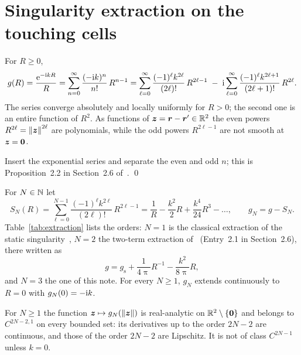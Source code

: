 \section{Singularity extraction on the touching cells}
\label{sec:extraction}

 For $R\ge0$,
\begin{equation}
    \label{eq:taylor}
    g(R) = \frac{\mathrm{e}^{-\mathrm{i} kR}}{R}
         = \sum_{n=0}^{\infty} \frac{(-\mathrm{i} k)^n}{n!}\,R^{n-1}
         = \sum_{\ell=0}^{\infty} \frac{(-1)^\ell k^{2\ell}}{(2\ell)!}\,R^{2\ell-1}
         \;-\;\mathrm{i} \sum_{\ell=0}^{\infty} \frac{(-1)^\ell k^{2\ell+1}}{(2\ell+1)!}\,R^{2\ell}.
\end{equation}
The series converge absolutely and locally uniformly for $R>0$; the second one is an entire function of $R^2$. As
functions of $\vb*{z}=\vb*{r}-\vb*{r}'\in\mathbb{R}^2$ the even powers $R^{2\ell}=\left\| \vb*{z} \right\|^{2\ell}$ are polynomials, while the odd powers
$R^{2\ell-1}$ are not smooth at $\vb*{z}=\vb*{0}$.

\vspace{\baselineskip}
\proof Insert the exponential series and separate the even and odd $n$; this is Proposition~2.2
in Section~2.6 of~\cite{machacek2025method}. \qed

 For $N\in\mathbb{N}$ let
\begin{equation}
    \label{eq:sn}
    S_N(R) = \sum_{\ell=0}^{N-1} \frac{(-1)^\ell k^{2\ell}}{(2\ell)!}\,R^{2\ell-1}
           = \frac{1}{R} - \frac{k^2}{2}R + \frac{k^4}{24}R^3 - \dots, \qquad
    g_N = g - S_N .
\end{equation}
Table~\ref{tab:extraction} lists the orders: $N=1$ is the classical extraction of the static singularity~\cite{Tzoulis2004}, $N=2$ the two-term extraction
of~\cite{machacek2025method} (Entry~2.1 in Section~2.6), there written as
\begin{equation}
    g=g_{\mathrm{s}}+\frac{1}{4\uppi}R^{-1}-\frac{k^2}{8\uppi}R,
\end{equation}
and $N=3$ the one of this note.
For every $N\ge1$, $g_N$ extends continuously to $R=0$ with $g_N(0)=-\mathrm{i} k$.

 For $N\ge1$ the function $\vb*{z}\mapsto g_N(\left\| \vb*{z} \right\|)$ is
real-analytic on $\mathbb{R}^2\setminus\{\vb*{0}\}$ and belongs to $C^{2N-2,1}$ on every bounded set: its derivatives up to the
order $2N-2$ are continuous, and those of the order $2N-2$ are Lipschitz.
It is not of class $C^{2N-1}$ unless $k=0$.

